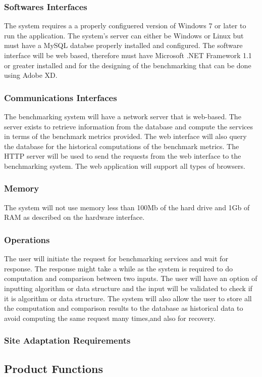 \documentclass[a4paper,12pt]{article}
\begin{document}
\subsubsection{Softwares Interfaces}
The system requires a a properly configuered version of Windows 7 or later to run the application. The system's server can either be Windows or Linux but must have a MySQL databse properly installed and configured. The software interface will be web based, therefore must have Microsoft .NET Framework 1.1 or greater installed and for the designing of the benchmarking that can be done using Adobe XD.

\subsubsection{Communications Interfaces}
The benchmarking system will have a network server that is web-based. The server exists to retrieve information from the database
and compute the services in terms of the benchmark metrics provided. The web interface will also query the database for the historical computations of the benchmark metrics. The HTTP server will be used to send the requests from the web interface to
the benchmarking system. The web application will support all types of browsers.
\subsubsection{Memory}
The system will not use memory less than 100Mb of the hard drive and 1Gb of RAM as described on the hardware interface.
\subsubsection{Operations}
The user will initiate the request for benchmarking services and wait for response. The response might take a while as the system is required to do computation and comparison between two inputs. The user will have an option of inputting algorithm or data structure and the input will be validated to check if it is algorithm or data structure. The system will also allow the user to store all the computation and comparison results to the database as historical data to avoid computing the same request many times,and also for recovery. 
\subsubsection{Site Adaptation Requirements}

\subsection{Product Functions}
\end{document}
